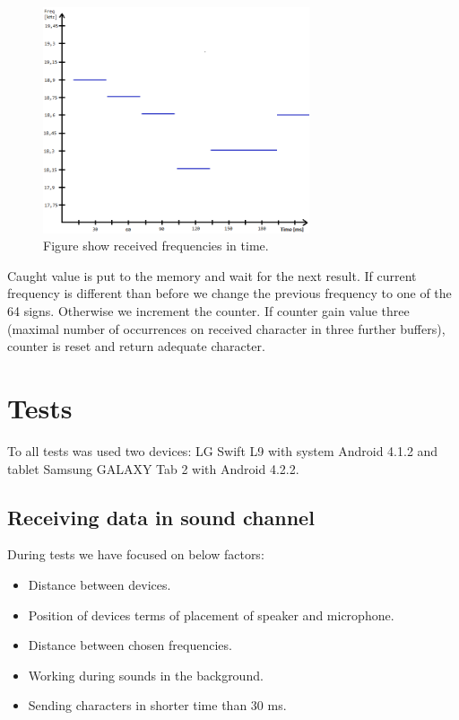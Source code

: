 \documentclass[11pt,titlepage]{article}
\theoremstyle{plain}
\begin{document}
\begin{figure}[H]
	\centering
	\includegraphics[width=0.70\textwidth]{img/receiving}
	\caption{Figure show received frequencies in time.}
\end{figure}

Caught value is put to the memory and wait for the next result. If current frequency is different than before we change the previous frequency to one of the 64 signs. Otherwise we increment the counter. If counter gain value three (maximal number of occurrences on received character in three further buffers), counter is reset and return adequate character.


\section{Tests}
To all tests was used two devices: LG Swift L9 with system Android 4.1.2 and tablet Samsung GALAXY Tab 2 with Android 4.2.2. 

\subsection{Receiving data in sound channel}
During tests we have focused on below factors:
\begin{itemize}
\item Distance between devices.
\item Position of devices terms of placement of speaker and microphone.
\item Distance between chosen frequencies.
\item Working during sounds in the background.
\item Sending characters in shorter time than 30 ms.
\end{itemize}
\end{document}
